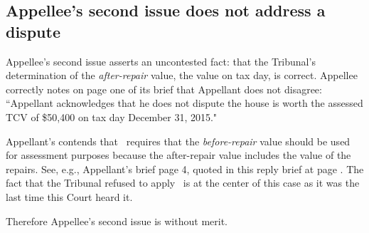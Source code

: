 \documentclass[12pt,\documentclassflag]{michiganCourtOfAppealsBrief}
\begin{document}
\subsection{Appellee's second issue does not address a dispute}

Appellee's second issue asserts an uncontested fact: that the Tribunal's determination of the {\em after-repair} value, the value on tax day, is correct. Appellee correctly notes on page one of its brief that Appellant does not disagree: ``Appellant acknowledges that he does not dispute the house is worth the assessed TCV of \$50,400 on tax day December 31, 2015."

Appellant's contends that \mathieuGast\ requires that the {\em before-repair} value should be used for assessment purposes because the after-repair value includes the value of the repairs.
See, e.g.,  Appellant's brief page 4, quoted in this reply brief at page \pageref{subsubsec:mainPoint}.
The fact that the Tribunal refused to apply \mathieuGast\ is at the center of this case as it was the last time this Court heard it.

Therefore Appellee's second issue is without merit.




\end{document}
